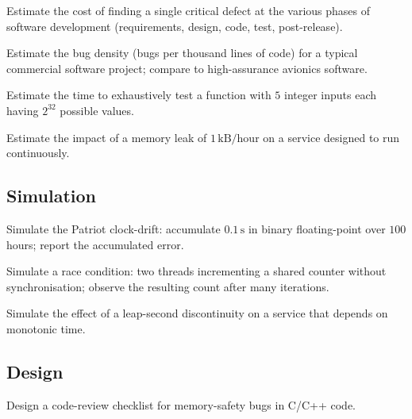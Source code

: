 \begin{exercise}
Estimate the cost of finding a single critical defect at the various phases of software development (requirements, design, code, test, post-release).
\end{exercise}

\begin{exercise}
Estimate the bug density (bugs per thousand lines of code) for a typical commercial software project; compare to high-assurance avionics software.
\end{exercise}

\begin{exercise}
Estimate the time to exhaustively test a function with $5$ integer inputs each having $2^{32}$ possible values.
\end{exercise}

\begin{exercise}
Estimate the impact of a memory leak of $1\,\text{kB/hour}$ on a service designed to run continuously.
\end{exercise}

\subsection*{Simulation}

\begin{exercise}
Simulate the Patriot clock-drift: accumulate $0.1\,\text{s}$ in binary floating-point over $100$ hours; report the accumulated error.
\end{exercise}

\begin{exercise}
Simulate a race condition: two threads incrementing a shared counter without synchronisation; observe the resulting count after many iterations.
\end{exercise}

\begin{exercise}
Simulate the effect of a leap-second discontinuity on a service that depends on monotonic time.
\end{exercise}

\subsection*{Design}

\begin{exercise}
Design a code-review checklist for memory-safety bugs in C/C++ code.
\end{exercise}

